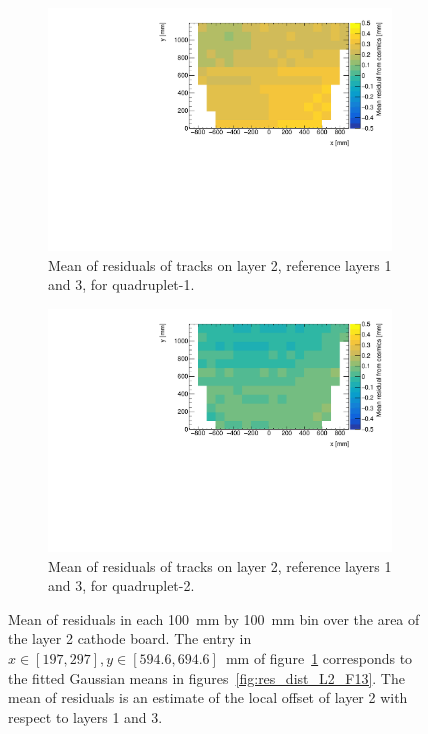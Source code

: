 \newpage
\thispagestyle{empty}
\begin{figure}
\centering
\begin{subfigure}{\textwidth}
  \centering
  \includegraphics[width=\linewidth]{figures/figure_QL2P11_3100V_2021-08-05_th2_means_layer2_fixedlayers13.pdf}
  \caption{Mean of residuals of tracks on layer 2, reference layers 1 and 3, for quadruplet-1.}
  \label{fig:res_mean_th2_ql2p11}
\end{subfigure}%
\vspace*{\floatsep}
\begin{subfigure}{\textwidth}
  \centering
  \includegraphics[width=\linewidth]{figures/figure_QL2P08_3100V_2021-08-03_th2_means_layer2_fixedlayers13.pdf}
  \caption{Mean of residuals of tracks on layer 2, reference layers 1 and 3, for quadruplet-2.}
  \label{fig:res_mean_th2_ql2p8}
\end{subfigure}
\caption{Mean of residuals in each \SI{100}{\milli\meter} by \SI{100}{\milli\meter} bin over the area of the layer 2 cathode board. The entry in $x\in\left[197, 297\right],  y\in\left[594.6, 694.6\right]$~mm of figure~\ref{fig:res_mean_th2_ql2p11} corresponds to the fitted Gaussian means in figures~\ref{fig:res_dist_L2_F13}. The mean of residuals is an estimate of the local offset of layer 2 with respect to layers 1 and 3.}
\label{fig:res_mean_th2}
\end{figure}
\newpage
\restoregeometry

